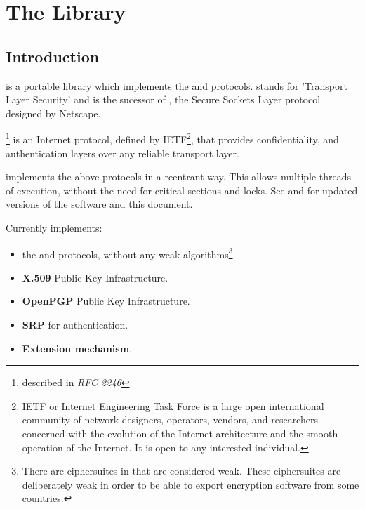 \documentclass{book}
\begin{document}



\tableofcontents
\newpage
{}
\pagestyle{fancy}

\chapter{The Library}
\section{Introduction}
\par
\gnutls{} is a portable library which implements the \tlsI{} and 
\sslIII{} protocols.
\tls{} stands for 'Transport Layer Security' and is the sucessor of \ssl{}, 
the Secure Sockets Layer protocol designed by Netscape. 

\tlsI{}\footnote{described in {\it RFC 2246}} is an Internet protocol,
defined by {IETF}\footnote{IETF or Internet Engineering Task Force 
is a large open international community of network
designers, operators, vendors, and researchers concerned with the evolution of 
the Internet architecture and the smooth operation of the Internet. It is open to any interested individual.}, 
that provides confidentiality, and authentication layers over any reliable
transport layer.

\par
\gnutls{} implements the above
protocols in a reentrant way. This allows multiple threads of
execution, without the need for critical sections and locks. See
and  
for updated versions of the \gnutls{} software and this document.

\par
Currently \gnutls{} implements:
\begin{itemize}
 \item the \tlsI{} and \sslIII{} protocols, without any weak algorithms\footnote{
There are ciphersuites in \tlsI{} that are considered weak. These
ciphersuites are deliberately weak in order to be able to export encryption
software from some countries.}
 \item {\bf X.509} Public Key Infrastructure.
 \item {\bf OpenPGP} Public Key Infrastructure.
 \item {\bf SRP} for \tls{} authentication.
 \item \tls{} {\bf Extension mechanism}.
\end{itemize}




















\end{document}
